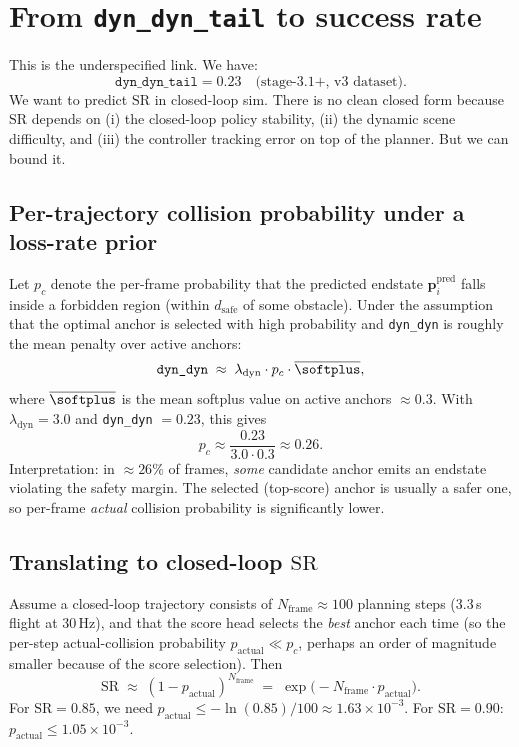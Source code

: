 \documentclass[11pt]{article}
\begin{document}
\section{From \texttt{dyn\_dyn\_tail} to success rate}

This is the underspecified link. We have:
\[
\texttt{dyn\_dyn\_tail} = 0.23 \quad \text{(stage-3.1+, v3 dataset)}.
\]
We want to predict $\text{SR}$ in closed-loop sim. There is no clean closed
form because $\text{SR}$ depends on (i) the closed-loop policy stability,
(ii) the dynamic scene difficulty, and (iii) the controller tracking error
on top of the planner. But we can bound it.

\subsection{Per-trajectory collision probability under a loss-rate prior}

Let $p_c$ denote the per-frame probability that the predicted endstate
$\bm{p}_i^{\text{pred}}$ falls inside a forbidden region (within $d_{\text{safe}}$
of some obstacle). Under the assumption that the optimal anchor is selected
with high probability and \texttt{dyn\_dyn} is roughly the mean penalty over
active anchors:
\begin{equation}\label{eq:pc-estimate}
\texttt{dyn\_dyn}
\;\approx\;
\lambda_{\text{dyn}} \cdot p_c \cdot \overline{\softplus} ,
\end{equation}
where $\overline{\softplus}$ is the mean softplus value on active anchors
$\approx 0.3$. With $\lambda_{\text{dyn}} = 3.0$ and
\texttt{dyn\_dyn} $= 0.23$, this gives
\begin{equation}
p_c \approx \frac{0.23}{3.0 \cdot 0.3} \approx 0.26.
\end{equation}
Interpretation: in $\approx 26\%$ of frames, \emph{some} candidate anchor
emits an endstate violating the safety margin. The selected (top-score)
anchor is usually a safer one, so per-frame \emph{actual} collision
probability is significantly lower.

\subsection{Translating to closed-loop $\text{SR}$}

Assume a closed-loop trajectory consists of $N_{\text{frame}} \approx 100$ planning
steps (3.3\,s flight at 30\,Hz), and that the score head selects the
\emph{best} anchor each time (so the per-step actual-collision probability
$p_{\text{actual}} \ll p_c$, perhaps an order of magnitude smaller because of
the score selection). Then
\begin{equation}\label{eq:sr-bound}
\text{SR}
\;\approx\;
(1 - p_{\text{actual}})^{N_{\text{frame}}}
\;=\;
\exp\!\bigl(-N_{\text{frame}} \cdot p_{\text{actual}}\bigr).
\end{equation}
For $\text{SR} = 0.85$, we need
$p_{\text{actual}} \le -\ln(0.85)/100 \approx 1.63 \times 10^{-3}$.
For $\text{SR} = 0.90$: $p_{\text{actual}} \le 1.05 \times 10^{-3}$.
\end{document}
